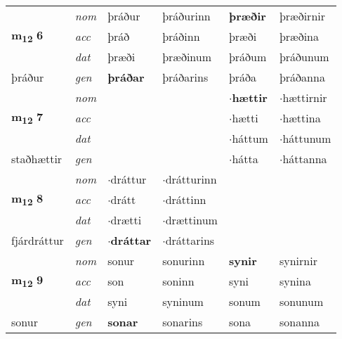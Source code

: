 \begin{longtable}[l]{llllll}
\multirow{3}{*}{{{\textbf{m{\textsubscript{12}}} \Large{\textbf{6}}}}}  & {\footnotesize{{\textit{nom}}}} & þráður & þráðurinn    & \textbf{þræðir} & þræðirnir  \\*
 &  {\footnotesize{{\textit{acc}}}} & þráð  & þráðinn   & þræði  & þræðina \\*
 &  {\footnotesize{{\textit{dat}}}} & þræði & þræðinum   & þráðum & þráðunum \\*
 {\footnotesize{þráður}} &   {\footnotesize{{\textit{gen}}}} & \textbf{þráðar}  & þráðarins  & þráða & þráðanna \\
\cmidrule{1-6}


\multirow{3}{*}{{{\textbf{m{\textsubscript{12}}} \Large{\textbf{7}}}}}  & {\footnotesize{{\textit{nom}}}} &  &     & \textbf{$\cdot$hættir} & $\cdot$hættirnir  \\*
 &  {\footnotesize{{\textit{acc}}}} &   &    & $\cdot$hætti  & $\cdot$hættina \\*
 &  {\footnotesize{{\textit{dat}}}} &  &    & $\cdot$háttum & $\cdot$háttunum \\*
 {\footnotesize{staðhættir}} &   {\footnotesize{{\textit{gen}}}} & \textbf{}  &   & $\cdot$hátta & $\cdot$háttanna \\
\cmidrule{1-6}


\multirow{3}{*}{{{\textbf{m{\textsubscript{12}}} \Large{\textbf{8}}}}}  & {\footnotesize{{\textit{nom}}}} & $\cdot$dráttur & $\cdot$drátturinn    & \textbf{} &   \\*
 &  {\footnotesize{{\textit{acc}}}} & $\cdot$drátt  & $\cdot$dráttinn   &   &  \\*
 &  {\footnotesize{{\textit{dat}}}} & $\cdot$drætti & $\cdot$drættinum   &  &  \\*
 {\footnotesize{fjárdráttur}} &   {\footnotesize{{\textit{gen}}}} & \textbf{$\cdot$dráttar}  & $\cdot$dráttarins  &  &  \\
\cmidrule{1-6}


\multirow{3}{*}{{{\textbf{m{\textsubscript{12}}} \Large{\textbf{9}}}}}  & {\footnotesize{{\textit{nom}}}} & sonur & sonurinn    & \textbf{synir} & synirnir  \\*
 &  {\footnotesize{{\textit{acc}}}} & son  & soninn   & syni  & synina \\*
 &  {\footnotesize{{\textit{dat}}}} & syni & syninum   & sonum & sonunum \\*
 {\footnotesize{sonur}} &   {\footnotesize{{\textit{gen}}}} & \textbf{sonar}  & sonarins  & sona & sonanna \\
\cmidrule{1-6}



\end{longtable}
